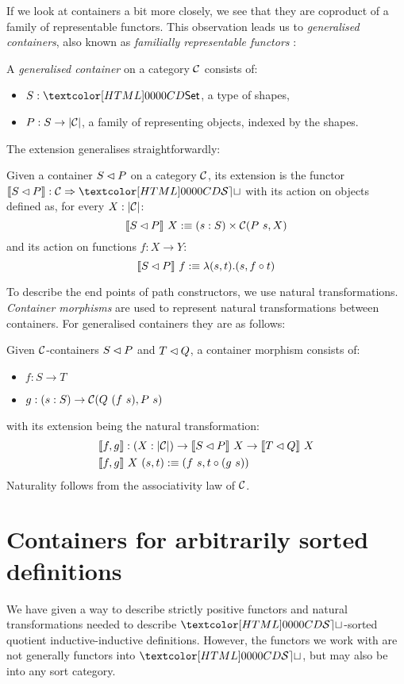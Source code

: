 If we look at containers a bit more closely, we see that they are
coproduct of a family of representable functors. This observation
leads us to \emph{generalised containers}, also known as
\emph{familially representable functors} \cite{Carboni1995}:
%
\begin{definition}
\label{def-gen-container}
  A \emph{generalised container} on a category $\mathcal{C}$ consists of:
  \begin{itemize}
  \item $S : \Set$, a type of shapes,
  \item $P : S \to | \mathcal{C} |$, a family of representing objects, indexed
    by the shapes.
  \end{itemize}
\end{definition}
%
The extension generalises straightforwardly:
%
\begin{definition}
  Given a container $S \lhd P$ on a category $\mathcal{C}$, its extension
  is the functor $\context{\cont{S}{P}} : \Func{\Cc}{\SET}$ with its
  action on objects defined as, for every $X : | \mathcal{C} |$:
  $$
  \llbracket S \lhd P \rrbracket\ X :\equiv (s : S) \times \mathcal{C}(P\ s, X)
  $$
  and its action on functions $f : X \to Y$:
  $$
  \llbracket S \lhd P \rrbracket\ f :\equiv \lambda (s , t) . (s , f \circ t)
  $$
\end{definition}
%

To describe the end points of path constructors, we use natural
transformations. \emph{Container morphisms} are used to represent
natural transformations between containers. For generalised containers
they are as follows:
\begin{definition}
  Given $\mathcal{C}$-containers $S \lhd P$ and $T \lhd Q$, a container
  morphism consists of:
  \begin{itemize}
  \item $f : S \to T$
  \item $g : (s : S) \to \Cc(Q\ (f\ s), P\ s)$
  \end{itemize}
  with its extension being the natural transformation:
  \begin{align*}
    &\llbracket f , g \rrbracket : (X : | \mathcal{C} |) \to \llbracket S \lhd P \rrbracket\ X \to \llbracket T \lhd Q \rrbracket\ X \\
    &\llbracket f , g \rrbracket\ X\ (s , t) :\equiv (f\ s , t \circ (g\ s))
  \end{align*}
  Naturality follows from the associativity law of $\mathcal{C}$.
\end{definition}

\section{Containers for arbitrarily sorted definitions}
We have given a way to describe strictly positive functors and natural
transformations needed to describe $\SET$-sorted quotient
inductive-inductive definitions. However, the functors we work with
are not generally functors into $\SET$, but may also be into any sort
category.

